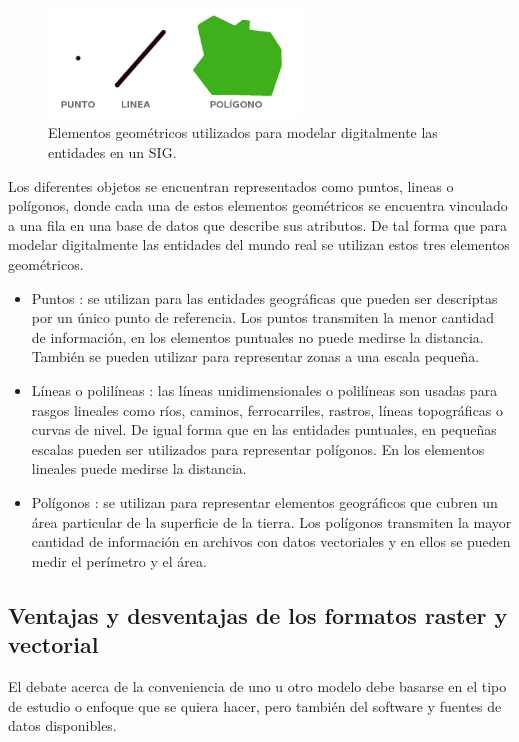 \begin{figure}
\centering
\includegraphics[width=0.6\textwidth]{capitulo-2/graphics/dimensiones-datos.jpg}
\caption{\label{fig:sig-xyz} Elementos geométricos utilizados para modelar digitalmente las entidades en un SIG.}
\end{figure}

Los diferentes objetos se encuentran representados como puntos, lineas o polígonos, donde cada una de estos elementos
geométricos se encuentra vinculado a una fila en una base de datos que describe sus atributos. De tal forma que para modelar
digitalmente las entidades del mundo real se utilizan estos tres elementos geométricos.
\begin{itemize}
    \item Puntos : se utilizan para las entidades geográficas que pueden ser descriptas por un único punto de referencia. Los
    puntos transmiten la menor cantidad de información, en los elementos puntuales no puede medirse la distancia. También
    se pueden utilizar para representar zonas a una escala pequeña.

    \item Líneas o polilíneas : las líneas unidimensionales o polilíneas son usadas para rasgos lineales como ríos,
    caminos, ferrocarriles, rastros, líneas topográficas o curvas de nivel. De igual forma que en las entidades
    puntuales, en pequeñas escalas pueden ser utilizados para representar polígonos. En los elementos lineales puede
    medirse la distancia.

    \item Polígonos : se utilizan para representar elementos geográficos que cubren un área particular de la superficie de la tierra.
    Los polígonos transmiten la mayor cantidad de información en archivos con datos vectoriales y en ellos se pueden medir el
    perímetro y el área.

\end{itemize}

\subsection{Ventajas y desventajas de los formatos raster y vectorial}
El debate acerca de la conveniencia de uno u otro modelo debe basarse en el tipo de estudio o enfoque que se quiera
hacer, pero también del software y fuentes de datos disponibles.

